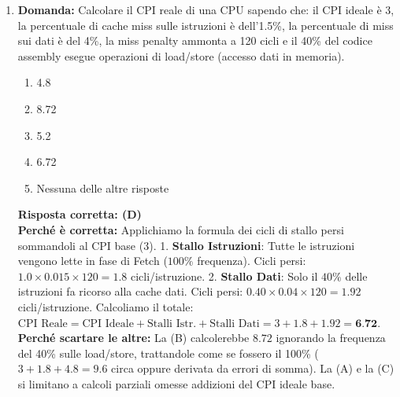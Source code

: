 \documentclass[12pt, a4paper]{article}
\begin{document}
\begin{enumerate}
    \item \textbf{Domanda:} Calcolare il CPI reale di una CPU sapendo che: il CPI ideale è 3, la percentuale di cache miss sulle istruzioni è dell'1.5\%, la percentuale di miss sui dati è del 4\%, la miss penalty ammonta a 120 cicli e il 40\% del codice assembly esegue operazioni di load/store (accesso dati in memoria).
    \begin{enumerate}[label=(\Alph*)]
        \item 4.8
        \item 8.72
        \item 5.2
        \item 6.72
        \item Nessuna delle altre risposte
    \end{enumerate}
    \textbf{Risposta corretta: (D)} \\
    \textbf{Perché è corretta:} Applichiamo la formula dei cicli di stallo persi sommandoli al CPI base (3).
    1. \textbf{Stallo Istruzioni}: Tutte le istruzioni vengono lette in fase di Fetch ($100\%$ frequenza). Cicli persi: $1.0 \times 0.015 \times 120 = 1.8$ cicli/istruzione.
    2. \textbf{Stallo Dati}: Solo il $40\%$ delle istruzioni fa ricorso alla cache dati. Cicli persi: $0.40 \times 0.04 \times 120 = 1.92$ cicli/istruzione.
    Calcoliamo il totale: $\text{CPI Reale} = \text{CPI Ideale} + \text{Stalli Istr.} + \text{Stalli Dati} = 3 + 1.8 + 1.92 = \textbf{6.72}$. \\
    \textbf{Perché scartare le altre:} La (B) calcolerebbe $8.72$ ignorando la frequenza del 40\% sulle load/store, trattandole come se fossero il 100\% ($3 + 1.8 + 4.8 = 9.6$ circa oppure derivata da errori di somma). La (A) e la (C) si limitano a calcoli parziali omesse addizioni del CPI ideale base.



\end{enumerate}
\end{document}
